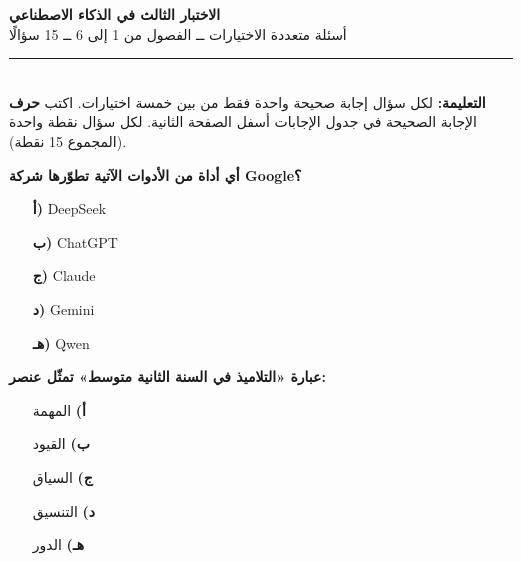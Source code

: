 \documentclass[11pt,a4paper]{article}
\begin{document}
\begin{center}
{\Large\khatt\textbf{الاختبار الثالث في الذكاء الاصطناعي}}\\[2pt]
{\normalsize أسئلة متعددة الاختيارات ــ الفصول من 1 إلى 6 ــ 15 سؤالًا}
\end{center}
\vspace{-4pt}\rule{\textwidth}{0.6pt}\\
{\small\textbf{التعليمة:} لكل سؤال إجابة صحيحة واحدة فقط من بين خمسة اختيارات.
اكتب \textbf{حرف} الإجابة الصحيحة في جدول الإجابات أسفل الصفحة الثانية.
لكل سؤال نقطة واحدة (المجموع 15 نقطة).}
\vspace{-2pt}
\begin{multicols}{2}

\noindent\begin{minipage}{\linewidth}
\hangindent=0.7cm\textbf{أي أداة من الأدوات الآتية تطوّرها شركة \textenglish{Google}؟}
\begin{itemize}[leftmargin=0.95cm, labelsep=4pt, itemsep=0pt, topsep=2pt, parsep=0pt]
  \item[\textbf{أ)}] \textenglish{DeepSeek}
  \item[\textbf{ب)}] \textenglish{ChatGPT}
  \item[\textbf{ج)}] \textenglish{Claude}
  \item[\textbf{د)}] \textenglish{Gemini}
  \item[\textbf{هـ)}] \textenglish{Qwen}
\end{itemize}
\end{minipage}\par\vspace{7pt plus 4pt}
\noindent\begin{minipage}{\linewidth}
\hangindent=0.7cm\textbf{عبارة «التلاميذ في السنة الثانية متوسط» تمثّل عنصر:}
\begin{itemize}[leftmargin=0.95cm, labelsep=4pt, itemsep=0pt, topsep=2pt, parsep=0pt]
  \item[\textbf{أ)}] المهمة
  \item[\textbf{ب)}] القيود
  \item[\textbf{ج)}] السياق
  \item[\textbf{د)}] التنسيق
  \item[\textbf{هـ)}] الدور
\end{itemize}
\end{minipage}\par\vspace{7pt plus 4pt}
\noindent\begin{minipage}{\linewidth}

\end{minipage}
\end{multicols}
\end{document}

